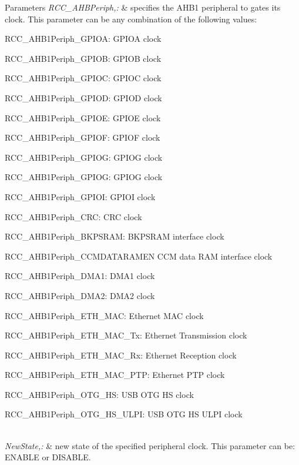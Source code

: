 \begin{DoxyParams}{Parameters}
{\em R\-C\-C\-\_\-\-A\-H\-B\-Periph,\-:} & specifies the A\-H\-B1 peripheral to gates its clock. This parameter can be any combination of the following values\-: \begin{DoxyItemize}
\item R\-C\-C\-\_\-\-A\-H\-B1\-Periph\-\_\-\-G\-P\-I\-O\-A\-: G\-P\-I\-O\-A clock \item R\-C\-C\-\_\-\-A\-H\-B1\-Periph\-\_\-\-G\-P\-I\-O\-B\-: G\-P\-I\-O\-B clock \item R\-C\-C\-\_\-\-A\-H\-B1\-Periph\-\_\-\-G\-P\-I\-O\-C\-: G\-P\-I\-O\-C clock \item R\-C\-C\-\_\-\-A\-H\-B1\-Periph\-\_\-\-G\-P\-I\-O\-D\-: G\-P\-I\-O\-D clock \item R\-C\-C\-\_\-\-A\-H\-B1\-Periph\-\_\-\-G\-P\-I\-O\-E\-: G\-P\-I\-O\-E clock \item R\-C\-C\-\_\-\-A\-H\-B1\-Periph\-\_\-\-G\-P\-I\-O\-F\-: G\-P\-I\-O\-F clock \item R\-C\-C\-\_\-\-A\-H\-B1\-Periph\-\_\-\-G\-P\-I\-O\-G\-: G\-P\-I\-O\-G clock \item R\-C\-C\-\_\-\-A\-H\-B1\-Periph\-\_\-\-G\-P\-I\-O\-G\-: G\-P\-I\-O\-G clock \item R\-C\-C\-\_\-\-A\-H\-B1\-Periph\-\_\-\-G\-P\-I\-O\-I\-: G\-P\-I\-O\-I clock \item R\-C\-C\-\_\-\-A\-H\-B1\-Periph\-\_\-\-C\-R\-C\-: C\-R\-C clock \item R\-C\-C\-\_\-\-A\-H\-B1\-Periph\-\_\-\-B\-K\-P\-S\-R\-A\-M\-: B\-K\-P\-S\-R\-A\-M interface clock \item R\-C\-C\-\_\-\-A\-H\-B1\-Periph\-\_\-\-C\-C\-M\-D\-A\-T\-A\-R\-A\-M\-E\-N C\-C\-M data R\-A\-M interface clock \item R\-C\-C\-\_\-\-A\-H\-B1\-Periph\-\_\-\-D\-M\-A1\-: D\-M\-A1 clock \item R\-C\-C\-\_\-\-A\-H\-B1\-Periph\-\_\-\-D\-M\-A2\-: D\-M\-A2 clock \item R\-C\-C\-\_\-\-A\-H\-B1\-Periph\-\_\-\-E\-T\-H\-\_\-\-M\-A\-C\-: Ethernet M\-A\-C clock \item R\-C\-C\-\_\-\-A\-H\-B1\-Periph\-\_\-\-E\-T\-H\-\_\-\-M\-A\-C\-\_\-\-Tx\-: Ethernet Transmission clock \item R\-C\-C\-\_\-\-A\-H\-B1\-Periph\-\_\-\-E\-T\-H\-\_\-\-M\-A\-C\-\_\-\-Rx\-: Ethernet Reception clock \item R\-C\-C\-\_\-\-A\-H\-B1\-Periph\-\_\-\-E\-T\-H\-\_\-\-M\-A\-C\-\_\-\-P\-T\-P\-: Ethernet P\-T\-P clock \item R\-C\-C\-\_\-\-A\-H\-B1\-Periph\-\_\-\-O\-T\-G\-\_\-\-H\-S\-: U\-S\-B O\-T\-G H\-S clock \item R\-C\-C\-\_\-\-A\-H\-B1\-Periph\-\_\-\-O\-T\-G\-\_\-\-H\-S\-\_\-\-U\-L\-P\-I\-: U\-S\-B O\-T\-G H\-S U\-L\-P\-I clock \end{DoxyItemize}
\\
\hline
{\em New\-State,\-:} & new state of the specified peripheral clock. This parameter can be\-: E\-N\-A\-B\-L\-E or D\-I\-S\-A\-B\-L\-E. \\
\hline
\end{DoxyParams}

